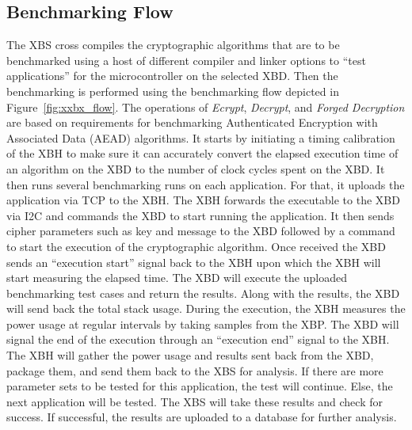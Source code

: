 \documentclass[10pt]{article}
\begin{document}
\subsection{Benchmarking Flow}
The XBS cross compiles the cryptographic algorithms that are to be benchmarked 
using a host of different compiler and linker options to ``test applications'' for the 
microcontroller on the selected XBD. 
Then the benchmarking is performed using the benchmarking flow depicted in Figure~\ref{fig:xxbx_flow}. 
The operations of \emph{Ecrypt}, \emph{Decrypt}, and \emph{Forged Decryption} are based on 
requirements for benchmarking Authenticated Encryption with Associated Data (AEAD) algorithms.
It starts by initiating a 
timing calibration of the XBH to make sure it can accurately convert the elapsed execution time
of an algorithm on the XBD to the number of clock cycles spent on the XBD.
It then runs several benchmarking runs on each application. 
For that, it uploads the application via TCP to the XBH.
The XBH forwards the executable to the XBD via I2C and commands the XBD to start 
running the application. It then sends cipher parameters such as key and message
to the XBD followed by a command to start the execution of the cryptographic
algorithm. Once received the XBD sends an ``execution start'' signal back to the
XBH upon which the XBH will start measuring the elapsed time.
The XBD will execute the uploaded benchmarking test cases and return the results. 
Along with the results, the XBD will send back
the total stack usage.
During the execution, the XBH measures the power usage at regular intervals by taking 
samples from the XBP. The XBD will signal the end of the execution through an 
``execution end'' signal to the XBH. The XBH will gather the power 
usage and results sent back from the XBD, package them, and send them back to the XBS 
for analysis.
If there are more parameter sets to be tested for this application, the test will 
continue. Else, the next application will be tested.
The XBS will take these results and check for success. If successful, the results are 
uploaded to a database for further analysis. 
\end{document}
